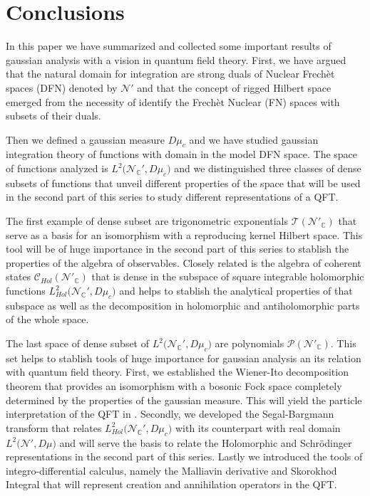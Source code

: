 \documentclass[12pt]{article}%
\begin{document}
\section{Conclusions}
\label{sec:conclusions}
 

In this paper we have summarized and collected some important results of gaussian analysis with a vision in quantum field theory. First, we have argued that the natural domain for integration are strong duals of Nuclear Frechèt spaces (DFN) denoted by $\mathcal{N}'$ and that the concept of rigged Hilbert space emerged from the necessity of identify the Frechèt Nuclear (FN) spaces with subsets of their duals. 

 Then we defined a gaussian measure $D\mu_c$ and we have studied gaussian integration theory of functions with domain in the model DFN space. The space of functions analyzed is $L^2\big({\mathcal{N}_{\mathbb{C}}'}, D\mu_c\big)$ and we distinguished three classes of dense subsets of functions  that unveil different properties of the space that will be used in the second part of this series \cite{alonso2023a} to study different representations of a QFT. 
 
 The first example of dense subset are trigonometric exponentials $\mathcal{T}(\mathcal{N}'_\mathbb{C})$ that serve as a basis for an isomorphism with a reproducing kernel Hilbert space. This tool will be of huge importance in the second part of this series to stablish the properties of the algebra of observables. Closely related is the algebra of coherent states $\mathcal{C}_{Hol}(\mathcal{N}'_\mathbb{C})$ that is dense in the subspace of square integrable holomorphic functions $L^2_{Hol}\big({\mathcal{N}_{\mathbb{C}}'}, D\mu_c\big)$ and helps to stablish the analytical properties of that subspace as well as the decomposition  in holomorphic and antiholomorphic parts of the whole space.

 The last space of dense subset of $L^2\big({\mathcal{N}_{\mathbb{C}}'}, D\mu_c\big)$ are polynomials  $\mathcal{P}(\mathcal{N}'_\mathbb{C})$. This set helps to stablish tools of huge importance for gaussian analysis an its relation with quantum field theory. First, we established the Wiener-Ito decomposition theorem that provides an isomorphism with a bosonic Fock space completely determined by the properties of the gaussian measure. This will yield the particle interpretation of the QFT in \cite{alonso2023a}. Secondly, we developed the Segal-Bargmann transform that relates $L^2_{Hol}\big({\mathcal{N}_{\mathbb{C}}'}, D\mu_c\big)$ with its counterpart with real domain $L^2\big({\mathcal{N}'}, D\mu\big)$ and will serve the basis to relate the Holomorphic and Schrödinger representations in the second part of this series. Lastly we introduced the tools of integro-differential calculus, namely the Malliavin derivative and Skorokhod Integral that will represent creation and annihilation operators in the QFT.  
\end{document}
